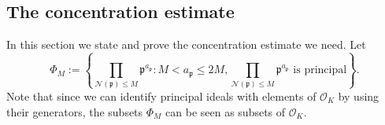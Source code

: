 \documentclass[11pt]{amsart}
\theoremstyle{definition}
\newcommand{\NN}{{\mathcal N}}
\begin{document}
\fi

 \subsection{The concentration estimate}
In this section we state and prove the concentration estimate we need.
  Let 
    \begin{equation}\label{folnerMult}
    \Phi_{M}:=\left\{\prod_{\NN(\mathfrak{p})\leq M}\mathfrak{p}^{a_{\mathfrak{p}}}\colon M<a_{\mathfrak{p}}\leq 2M, \prod_{\NN(\mathfrak{p})\leq M}\mathfrak{p}^{a_{\mathfrak{p}}} \text{ is principal} \right\}.
       \end{equation} 
    Note that since we can identify principal ideals with elements of $\mathcal{O}_K$ by using their generators, the subsets $\Phi_M$ can be seen as subsets of $\mathcal{O}_K$. 
\end{document}
